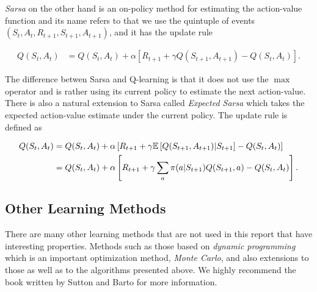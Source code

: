 \documentclass[result.tex]{subfiles}
\begin{document}
    \textit{Sarsa} on the other hand is an on-policy method for estimating the action-value function and its name refers to that we use the quintuple of events $(S_t, A_t, R_{t + 1}, S_{t + 1}, A_{t + 1})$, and it has the update rule

    \begin{align*}
        Q(S_t, A_t) &=
        Q(S_t , A_t) +
        \alpha \left[
        R_{t + 1} +
        \gamma Q(S_{t + 1}, A_{t + 1}) - Q(S_t, A_t)
        \right].
    \end{align*}

    The difference betwen Sarsa and Q-learning is that it does not use the $\max$ operator and is rather using its current policy to estimate the next action-value. There is also a natural extension to Sarsa called \textit{Expected Sarsa} which takes the expected action-value estimate under the current policy. The update rule is defined as

    \begin{align*}
        Q(S_t, A_t) &=
        Q(S_t , A_t) +
        \alpha \left[
        R_{t + 1} +
        \gamma \mathbb{E} \left[ Q(S_{t + 1}, A_{t + 1}) | S_{t + 1}
        \right] -
        Q(S_t, A_t)
        \right] \\
        &=
        Q(S_t , A_t) +
        \alpha \left[
        R_{t + 1} +
        \gamma \sum_a \pi (a | S_{t + 1}) Q(S_{t + 1}, a) -
        Q(S_t, A_t)
        \right].
    \end{align*}

    \subsection*{Other Learning Methods}

    There are many other learning methods that are not used in this report that have interesting properties. Methods such as those based on \textit{dynamic programming} which is an important optimization method, \textit{Monte Carlo}, and also extensions to those as well as to the algorithms presented above. We highly recommend the book written by Sutton and Barto \cite{sutton1998reinforcement} for more information.
\end{document}

